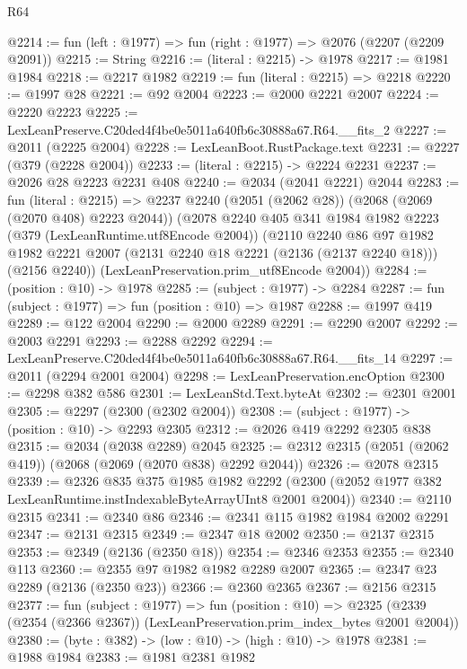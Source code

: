 \begin{lexlean}{R64}
\begin{coremodule}
@2214 := fun (left : @1977) => fun (right : @1977) => @2076 (@2207 (@2209 @2091))
@2215 := String
@2216 := (literal : @2215) -> @1978
@2217 := @1981 @1984
@2218 := @2217 @1982
@2219 := fun (literal : @2215) => @2218
@2220 := @1997 @28
@2221 := @92 @2004
@2223 := @2000 @2221 @2007
@2224 := @2220 @2223
@2225 := LexLeanPreserve.C20ded4f4be0e5011a640fb6c30888a67.R64.__fits_2
@2227 := @2011 (@2225 @2004)
@2228 := LexLeanBoot.RustPackage.text
@2231 := @2227 (@379 (@2228 @2004))
@2233 := (literal : @2215) -> @2224 @2231
@2237 := @2026 @28 @2223 @2231 @408
@2240 := @2034 (@2041 @2221) @2044
@2283 := fun (literal : @2215) =>
  @2237
    @2240
    (@2051 (@2062 @28))
    (@2068 (@2069 (@2070 @408) @2223 @2044))
    (@2078
      @2240
      @405
      @341
      @1984
      @1982
      @2223
      (@379 (LexLeanRuntime.utf8Encode @2004))
      (@2110
        @2240
        @86
        @97
        @1982
        @1982
        @2221
        @2007
        (@2131 @2240 @18 @2221 (@2136 (@2137 @2240 @18)))
        (@2156 @2240))
      (LexLeanPreservation.prim_utf8Encode @2004))
@2284 := (position : @10) -> @1978
@2285 := (subject : @1977) -> @2284
@2287 := fun (subject : @1977) => fun (position : @10) => @1987
@2288 := @1997 @419
@2289 := @122 @2004
@2290 := @2000 @2289
@2291 := @2290 @2007
@2292 := @2003 @2291
@2293 := @2288 @2292
@2294 := LexLeanPreserve.C20ded4f4be0e5011a640fb6c30888a67.R64.__fits_14
@2297 := @2011 (@2294 @2001 @2004)
@2298 := LexLeanPreservation.encOption
@2300 := @2298 @382 @586
@2301 := LexLeanStd.Text.byteAt
@2302 := @2301 @2001
@2305 := @2297 (@2300 (@2302 @2004))
@2308 := (subject : @1977) -> (position : @10) -> @2293 @2305
@2312 := @2026 @419 @2292 @2305 @838
@2315 := @2034 (@2038 @2289) @2045
@2325 := @2312 @2315 (@2051 (@2062 @419)) (@2068 (@2069 (@2070 @838) @2292 @2044))
@2326 := @2078 @2315
@2339 := @2326
    @835
    @375
    @1985
    @1982
    @2292
    (@2300 (@2052 @1977 @382 LexLeanRuntime.instIndexableByteArrayUInt8 @2001 @2004))
@2340 := @2110 @2315
@2341 := @2340 @86
@2346 := @2341 @115 @1982 @1984 @2002 @2291
@2347 := @2131 @2315
@2349 := @2347 @18 @2002
@2350 := @2137 @2315
@2353 := @2349 (@2136 (@2350 @18))
@2354 := @2346 @2353
@2355 := @2340 @113
@2360 := @2355 @97 @1982 @1982 @2289 @2007
@2365 := @2347 @23 @2289 (@2136 (@2350 @23))
@2366 := @2360 @2365
@2367 := @2156 @2315
@2377 := fun (subject : @1977) =>
  fun (position : @10) =>
  @2325 (@2339 (@2354 (@2366 @2367)) (LexLeanPreservation.prim_index_bytes @2001 @2004))
@2380 := (byte : @382) -> (low : @10) -> (high : @10) -> @1978
@2381 := @1988 @1984
@2383 := @1981 @2381 @1982

\end{coremodule}
\end{lexlean}
